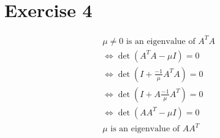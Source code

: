 \section*{Exercise 4}
\begin{eqnarray*}
\mu \neq 0 \text{ is an eigenvalue of } A^TA\\
\Leftrightarrow \det\left(A^TA-\mu I\right)=0\\
\Leftrightarrow \det\left(I+ \frac{-1}{\mu}A^TA\right) = 0\\
\Leftrightarrow \det\left(I+ A\frac{-1}{\mu}A^T\right) = 0\\
\Leftrightarrow \det\left(AA^T-\mu I\right)=0\\
\mu\text{ is an eigenvalue of }AA^T
\end{eqnarray*}